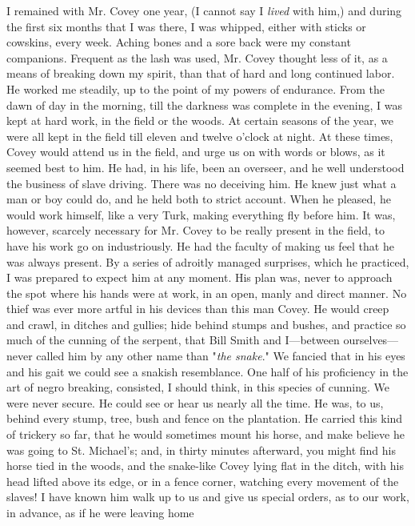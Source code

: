 I remained with Mr. Covey one year, (I cannot say I \emph{lived} with
him,) and during the first six months that I was there, I was whipped,
either with sticks or cowskins, every week. Aching bones and a sore back
{}were my constant companions. Frequent as the lash was used, Mr. Covey
thought less of it, as a means of breaking down my spirit, than that of
hard and long continued labor. He worked me steadily, up to the point of
my powers of endurance. From the dawn of day in the morning, till the
darkness was complete in the evening, I was kept at hard work, in the
field or the woods. At certain seasons of the year, we were all kept in
the field till eleven and twelve o'clock at night. At these times, Covey
would attend us in the field, and urge us on with words or blows, as it
seemed best to him. He had, in his life, been an overseer, and he well
understood the business of slave driving. There was no deceiving him. He
knew just what a man or boy could do, and he held both to strict
account. When he pleased, he would work himself, like a very Turk,
making everything fly before him. It was, however, scarcely necessary
for Mr. Covey to be really present in the field, to have his work go on
industriously. He had the faculty of making us feel that he was always
present. By a series of adroitly managed surprises, which he practiced,
I was prepared to expect him at any moment. His plan was, never to
approach the spot where his hands were at work, in an open, manly and
direct manner. No thief was ever more artful in his devices than this
man Covey. He would creep and crawl, in ditches and gullies; hide behind
stumps and bushes, and practice so much of the cunning of the serpent,
that Bill Smith and I---between ourselves---never called him by any
other name than "\emph{the snake}." We fancied that in his eyes and his
gait we could see a {}snakish resemblance. One half of his proficiency
in the art of negro breaking, consisted, I should think, in this species
of cunning. We were never secure. He could see or hear us nearly all the
time. He was, to us, behind every stump, tree, bush and fence on the
plantation. He carried this kind of trickery so far, that he would
sometimes mount his horse, and make believe he was going to St.
Michael's; and, in thirty minutes afterward, you might find his horse
tied in the woods, and the snake-like Covey lying flat in the ditch,
with his head lifted above its edge, or in a fence corner, watching
every movement of the slaves! I have known him walk up to us and give us
special orders, as to our work, in advance, as if he were leaving home
